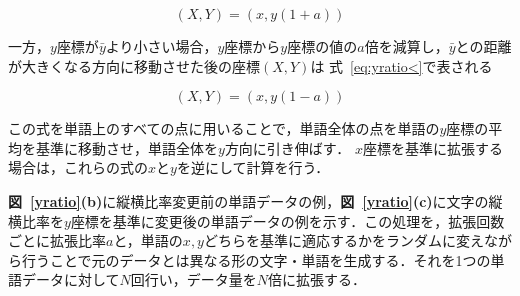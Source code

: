 \begin{equation}
  (X, Y) = (x, y(1+a))
  \label{eq:yratio>}
\end{equation}

一方，$y$座標が$\bar{y}$より小さい場合，$y$座標から$y$座標の値の$a$倍を減算し，$\bar{y}$との距離が大きくなる方向に移動させた後の座標$(X, Y)$は 式~\ref{eq:yratio<}で表される

\begin{equation}
  (X, Y) = (x, y(1-a))
  \label{eq:yratio<}
\end{equation}

この式を単語上のすべての点に用いることで，単語全体の点を単語の$y$座標の平均を基準に移動させ，単語全体を$y$方向に引き伸ばす．
$x$座標を基準に拡張する場合は，これらの式の$x$と$y$を逆にして計算を行う．


\textbf{図~\ref{yratio}(b)}に縦横比率変更前の単語データの例，\textbf{図~\ref{yratio}(c)}に文字の縦横比率を$y$座標を基準に変更後の単語データの例を示す．この処理を，拡張回数ごとに拡張比率$a$と，単語の$x,y$どちらを基準に適応するかをランダムに変えながら行うことで元のデータとは異なる形の文字・単語を生成する．それを1つの単語データに対して$N$回行い，データ量を$N$倍に拡張する．

